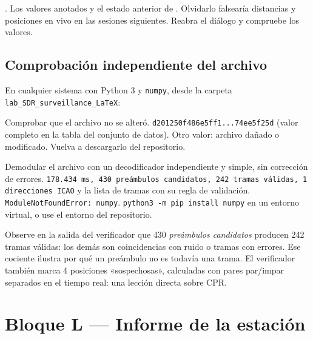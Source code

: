 {.}
{Los valores anotados y el estado anterior de .}
{Olvidarlo falsearía distancias y posiciones en vivo en las sesiones siguientes.}
{}
{Reabra el diálogo y compruebe los valores.}
{}

\subsection{Comprobación independiente del archivo}
\label{sec:u-sha}

En cualquier sistema con Python 3 y \texttt{numpy}, desde la carpeta \texttt{lab\_SDR\_surveillance\_LaTeX}:

{Comprobar que el archivo no se alteró.}
{\texttt{d201250f486e5ff1...74ee5f25d} (valor completo en la tabla del conjunto de datos).}
{Otro valor: archivo dañado o modificado.}
{Vuelva a descargarlo del repositorio.}

{Demodular el archivo con un decodificador independiente y simple, sin corrección de errores.}
{\texttt{178.434 ms, 430 preámbulos candidatos, 242 tramas válidas, 1 direcciones ICAO} y la lista de tramas con su regla de validación.}
{\texttt{ModuleNotFoundError: numpy}.}
{\texttt{python3 -m pip install numpy} en un entorno virtual, o use el entorno del repositorio.}

\begin{esperado}
Observe en la salida del verificador que 430 \emph{preámbulos candidatos} producen 242 tramas válidas: los demás son coincidencias con ruido o tramas con errores. Ese cociente ilustra por qué un preámbulo no es todavía una trama. El verificador también marca 4 posiciones «sospechosas», calculadas con pares par/impar separados en el tiempo real: una lección directa sobre CPR.
\end{esperado}

\section{Bloque L --- Informe de la estación}
\label{sec:u-informe}

